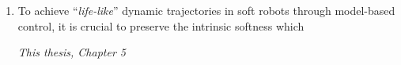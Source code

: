 \documentclass[a5paper]{article}
\begin{document}
\begin{enumerate}

  \item To achieve ``\textit{life-like}'' dynamic trajectories in soft robots through model-based control, it is crucial to preserve the intrinsic softness which
  \begin{flushright}
  \vspace{-2mm}
  \textit{This thesis, Chapter 5}
  \vspace{-1mm}
  \end{flushright}
  
  
  

\end{enumerate}
\end{document}

